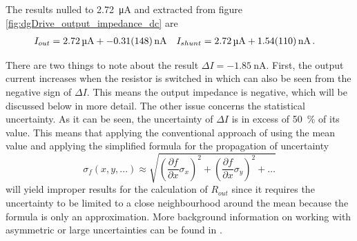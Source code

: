The results nulled to \qty{2.72}{\uA} and extracted from figure \ref{fig:dgDrive_output_impedance_dc} are
\begin{align}
    I_{out} &= \qty{2.72}{\uA} + \qty{-0.31 \pm 1.48}{\nA} & I_{shunt} &= \qty{2.72}{\uA} + \qty{1.54 \pm 1.10}{\nA}\,. \label{eqn:measurement_output_impedance_dc}
\end{align}

There are two things to note about the result $\Delta I = \qty{-1.85}{\nA}$. First, the output current increases when the resistor is switched in which can also be seen from the negative sign of $\Delta I$. This means the output impedance is negative, which will be discussed below in more detail. The other issue concerns the statistical uncertainty. As it can be seen, the uncertainty of $\Delta I$ is in excess of \qty{50}{\percent} of its value. This means that applying the conventional approach of using the mean value and applying the simplified formula for the propagation of uncertainty
\begin{equation*}
    \sigma_f(x,y,...) \approx \sqrt{\left(\frac{\partial f}{\partial x} \sigma_x \right)^2 + \left(\frac{\partial f}{\partial x} \sigma_y\right)^2 + \dots}
\end{equation*}
will yield improper results for the calculation of $R_{out}$ since it requires the uncertainty to be limited to a close neighbourhood around the mean because the formula is only an approximation. More background information on working with asymmetric or large uncertainties can be found in \cite{asymmetric_uncertainty}.

